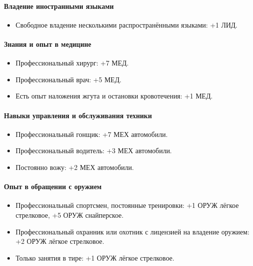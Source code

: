 \documentclass{article}
\begin{document}
\paragraph{Владение иностранными
языками}\label{languages}

\begin{itemize}
\item
  Свободное владение несколькими распространёнными языками: +1 ЛИД.
\end{itemize}

\paragraph{Знания и опыт в
медицине}\label{medical-experience}

\begin{itemize}
\item
  Профессиональный хирург: +7 МЕД.
\item
  Профессиональный врач: +5 МЕД.
\item
  Есть опыт наложения жгута и остановки кровотечения: +1 МЕД.
\end{itemize}

\paragraph{Навыки управления и обслуживания
техники}\label{vehicle-skills}

\begin{itemize}
\item
  Профессиональный гонщик: +7 МЕХ автомобили.
\item
  Профессиональный водитель: +3 МЕХ автомобили.
\item
  Постоянно вожу: +2 МЕХ автомобили.
\end{itemize}

\paragraph{Опыт в обращении с
оружием}\label{weapon-experience}

\begin{itemize}
\item
  Профессиональный спортсмен, постоянные тренировки: +1 ОРУЖ лёгкое
  стрелковое, +5 ОРУЖ снайперское.
\item
  Профессиональный охранник или охотник с лицензией на владение оружием:
  +2 ОРУЖ лёгкое стрелковое.
\item
  Только занятия в тире: +1 ОРУЖ лёгкое стрелковое.
\end{itemize}
\end{document}
